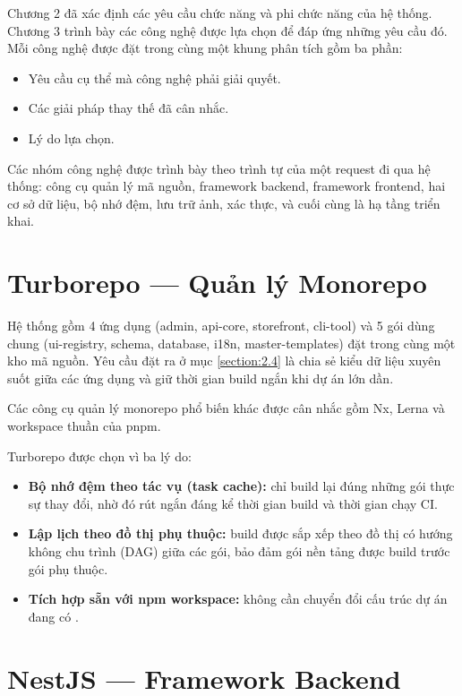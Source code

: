 \documentclass[../main.tex]{subfiles}
\begin{document}
Chương 2 đã xác định các yêu cầu chức năng và phi chức năng của hệ thống. Chương 3 trình bày các công nghệ được lựa chọn để đáp ứng những yêu cầu đó. Mỗi công nghệ được đặt trong cùng một khung phân tích gồm ba phần:

\begin{itemize}
    \item Yêu cầu cụ thể mà công nghệ phải giải quyết.
    \item Các giải pháp thay thế đã cân nhắc.
    \item Lý do lựa chọn.
\end{itemize}

Các nhóm công nghệ được trình bày theo trình tự của một request đi qua hệ thống: công cụ quản lý mã nguồn, framework backend, framework frontend, hai cơ sở dữ liệu, bộ nhớ đệm, lưu trữ ảnh, xác thực, và cuối cùng là hạ tầng triển khai.

\section{Turborepo --- Quản lý Monorepo}
\label{section:3.1}

Hệ thống gồm 4 ứng dụng (admin, api-core, storefront, cli-tool) và 5 gói dùng chung (ui-registry, schema, database, i18n, master-templates) đặt trong cùng một kho mã nguồn. Yêu cầu đặt ra ở mục \ref{section:2.4} là chia sẻ kiểu dữ liệu xuyên suốt giữa các ứng dụng và giữ thời gian build ngắn khi dự án lớn dần.

Các công cụ quản lý monorepo phổ biến khác được cân nhắc gồm Nx, Lerna và workspace thuần của pnpm.

Turborepo được chọn vì ba lý do:

\begin{itemize}
    \item \textbf{Bộ nhớ đệm theo tác vụ (task cache):} chỉ build lại đúng những gói thực sự thay đổi, nhờ đó rút ngắn đáng kể thời gian build và thời gian chạy CI.
    \item \textbf{Lập lịch theo đồ thị phụ thuộc:} build được sắp xếp theo đồ thị có hướng không chu trình (DAG) giữa các gói, bảo đảm gói nền tảng được build trước gói phụ thuộc.
    \item \textbf{Tích hợp sẵn với npm workspace:} không cần chuyển đổi cấu trúc dự án đang có \cite{turborepo_docs}.
\end{itemize}

\section{NestJS --- Framework Backend}
\label{section:3.2}
\end{document}
